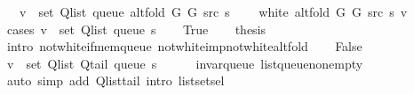 \begin{isabellebody}
\ \ \ {\isachardoublequoteopen}v\ {\isasymin}\ set\ {\isacharparenleft}{\kern0pt}Q{\isacharunderscore}{\kern0pt}list\ {\isacharparenleft}{\kern0pt}queue\ {\isacharparenleft}{\kern0pt}alt{\isacharunderscore}{\kern0pt}fold\ G{}\ G{}\ src\ s{\isacharparenright}{\kern0pt}{\isacharparenright}{\kern0pt}{\isacharparenright}{\kern0pt}{\isachardoublequoteclose}\isanewline
\ \ \ {\isachardoublequoteopen}{\isasymnot}\ white\ {\isacharparenleft}{\kern0pt}alt{\isacharunderscore}{\kern0pt}fold\ G{}\ G{}\ src\ s{\isacharparenright}{\kern0pt}\ v{\isachardoublequoteclose}%
\endisataginvisible
{\isafoldinvisible}%
%
\isadeliminvisible
\isanewline
%
\endisadeliminvisible
%
\isadelimproof
%
\endisadelimproof
%
\isatagproof
{}\isamarkupfalse%
\ {\isacharparenleft}{\kern0pt}cases\ {\isachardoublequoteopen}v\ {\isasymin}\ set\ {\isacharparenleft}{\kern0pt}Q{\isacharunderscore}{\kern0pt}list\ {\isacharparenleft}{\kern0pt}queue\ s{\isacharparenright}{\kern0pt}{\isacharparenright}{\kern0pt}{\isachardoublequoteclose}{\isacharparenright}{\kern0pt}\isanewline
\ \ \isamarkupfalse%
\ True\isanewline
\ \ \isamarkupfalse%
\ {\isacharquery}{\kern0pt}thesis\isanewline
\ \ \ \ \isamarkupfalse%
\ {\isacharparenleft}{\kern0pt}intro\ not{\isacharunderscore}{\kern0pt}white{\isacharunderscore}{\kern0pt}if{\isacharunderscore}{\kern0pt}mem{\isacharunderscore}{\kern0pt}queue\ not{\isacharunderscore}{\kern0pt}white{\isacharunderscore}{\kern0pt}imp{\isacharunderscore}{\kern0pt}not{\isacharunderscore}{\kern0pt}white{\isacharunderscore}{\kern0pt}alt{\isacharunderscore}{\kern0pt}fold{\isacharparenright}{\kern0pt}\isanewline
{}\isamarkupfalse%
\isanewline
\ \ \isamarkupfalse%
\ False\isanewline
\ \ \isamarkupfalse%
\ {\isachardoublequoteopen}v\ {\isasymnotin}\ set\ {\isacharparenleft}{\kern0pt}Q{\isacharunderscore}{\kern0pt}list\ {\isacharparenleft}{\kern0pt}Q{\isacharunderscore}{\kern0pt}tail\ {\isacharparenleft}{\kern0pt}queue\ s{\isacharparenright}{\kern0pt}{\isacharparenright}{\kern0pt}{\isacharparenright}{\kern0pt}{\isachardoublequoteclose}\isanewline
\ \ \ \ \isamarkupfalse%
\ invar{\isacharunderscore}{\kern0pt}queue\ list{\isacharunderscore}{\kern0pt}queue{\isacharunderscore}{\kern0pt}non{\isacharunderscore}{\kern0pt}empty\isanewline
\ \ \ \ \isamarkupfalse%
\ {\isacharparenleft}{\kern0pt}auto\ simp\ add{\isacharcolon}{\kern0pt}\ Q{\isachardot}{\kern0pt}list{\isacharunderscore}{\kern0pt}tail\ intro{\isacharcolon}{\kern0pt}\ list{\isachardot}{\kern0pt}set{\isacharunderscore}{\kern0pt}sel{\isacharparenleft}{\kern0pt}{}{\isacharparenright}{\kern0pt}{\isacharparenright}{\kern0pt}\isanewline

\end{isabellebody}
